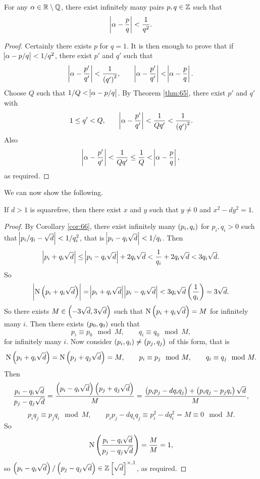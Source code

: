 \pagebreak

\begin{corollary}
\label{cor:66}
For any $ \alpha \in \mathbb{R} \setminus \mathbb{Q} $, there exist infinitely many pairs $ p, q \in \mathbb{Z} $ such that
$$ \abs{\alpha - \dfrac{p}{q}} < \dfrac{1}{q^2}. $$
\end{corollary}

\begin{proof}
Certainly there exists $ p $ for $ q = 1 $. It is then enough to prove that if $ \abs{\alpha - p / q} < 1 / q^2 $, there exist $ p' $ and $ q' $ such that
$$ \abs{\alpha - \dfrac{p'}{q'}} < \dfrac{1}{\br{q'}^2}, \qquad \abs{\alpha - \dfrac{p'}{q'}} < \abs{\alpha - \dfrac{p}{q}}. $$
Choose $ Q $ such that $ 1 / Q < \abs{\alpha - p / q} $. By Theorem \ref{thm:65}, there exist $ p' $ and $ q' $ with
$$ 1 \le q' < Q, \qquad \abs{\alpha - \dfrac{p'}{q'}} < \dfrac{1}{Qq'} < \dfrac{1}{\br{q'}^2}. $$
Also
$$ \abs{\alpha - \dfrac{p'}{q'}} < \dfrac{1}{Qq'} \le \dfrac{1}{Q} < \abs{\alpha - \dfrac{p}{q}}, $$
as required.
\end{proof}

We can now show the following.

\begin{theorem}
If $ d > 1 $ is squarefree, then there exist $ x $ and $ y $ such that $ y \ne 0 $ and $ x^2 - dy^2 = 1 $.
\end{theorem}

\begin{proof}
By Corollary \ref{cor:66}, there exist infinitely many $ \br{p_i, q_i} $ for $ p_i, q_i > 0 $ such that $ \abs{p_i / q_i - \sqrt{d}} < 1 / q_i^2 $, that is $ \abs{p_i - q_i\sqrt{d}} < 1 / q_i $. Then
$$ \abs{p_i + q_i\sqrt{d}} \le \abs{p_i - q_i\sqrt{d}} + 2q_i\sqrt{d} < \dfrac{1}{q_i} + 2q_i\sqrt{d} < 3q_i\sqrt{d}. $$
So
$$ \abs{\N\br{p_i + q_i\sqrt{d}}} = \abs{p_i + q_i\sqrt{d}}\abs{p_i - q_i\sqrt{d}} < 3q_i\sqrt{d}\br{\dfrac{1}{q_i}} = 3\sqrt{d}. $$
So there exists $ M \in \br{-3\sqrt{d}, 3\sqrt{d}} $ such that $ \N\br{p_i + q_i\sqrt{d}} = M $ for infinitely many $ i $. Then there exists $ \br{p_0, q_0} $ such that
$$ p_i \equiv p_0 \mod M, \qquad q_i \equiv q_0 \mod M, $$
for infinitely many $ i $. Now consider $ \br{p_i, q_i} \ne \br{p_j, q_j} $ of this form, that is
$$ \N\br{p_i + q_i\sqrt{d}} = \N\br{p_j + q_j\sqrt{d}} = M, \qquad p_i \equiv p_j \mod M, \qquad q_i \equiv q_j \mod M. $$
Then
$$ \dfrac{p_i - q_i\sqrt{d}}{p_j - q_j\sqrt{d}} = \dfrac{\br{p_i - q_i\sqrt{d}}\br{p_j + q_j\sqrt{d}}}{M} = \dfrac{\br{p_ip_j - dq_iq_j} + \br{p_iq_j - p_jq_i}\sqrt{d}}{M}, $$
$$ p_iq_j \equiv p_jq_i \mod M, \qquad p_ip_j - dq_iq_j \equiv p_i^2 - dq_i^2 = M \equiv 0 \mod M. $$
So
$$ \N\br{\dfrac{p_i - q_i\sqrt{d}}{p_j - q_j\sqrt{d}}} = \dfrac{M}{M} = 1, $$
so $ \br{p_i - q_i\sqrt{d}} / \br{p_j - q_j\sqrt{d}} \in \ZZ\sbr{\sqrt{d}}^{\times, 1} $, as required.
\end{proof}

